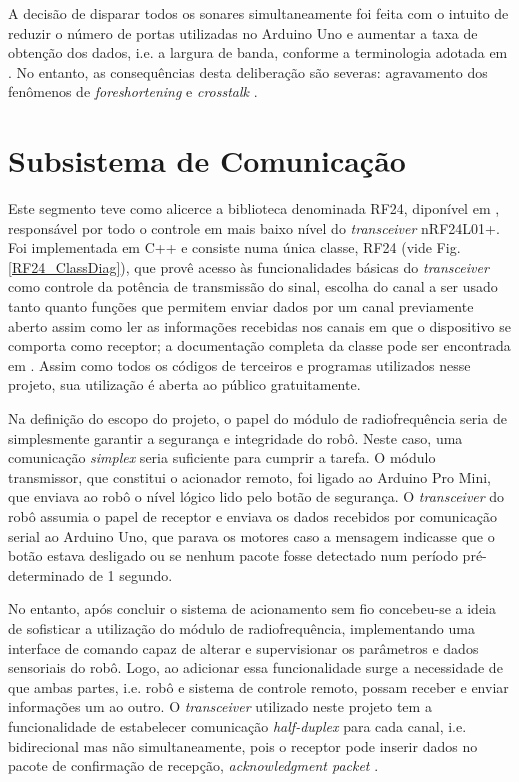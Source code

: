 A decisão de disparar todos os sonares simultaneamente foi feita com o intuito de reduzir o número de portas utilizadas no Arduino Uno e aumentar 
a taxa de obtenção dos dados, i.e. a largura de banda, conforme a terminologia adotada  em \cite{roseli}.
No entanto, as consequências desta deliberação são  severas: agravamento dos fenômenos de \textit{foreshortening} e \textit{crosstalk} 
\cite{2016_artigo_5}. %


\section{Subsistema de Comunicação}
Este segmento teve como alicerce a biblioteca denominada RF24, diponível em \cite{nrf_lib}, responsável por todo o controle em mais baixo nível do 
\textit{transceiver} nRF24L01+.
Foi implementada em C++ e consiste numa única classe, RF24 (vide Fig.\ref{RF24_ClassDiag}), que provê acesso às funcionalidades básicas do 
\textit{transceiver} 
como controle da potência de transmissão do sinal, escolha do canal a ser usado tanto quanto funções que permitem enviar dados por um canal 
previamente aberto assim como ler as informações recebidas nos canais em que o dispositivo se comporta como receptor; a documentação completa da 
classe pode ser encontrada em \cite{RF24_class_doc}.
Assim como todos os códigos de terceiros e programas utilizados nesse projeto, sua utilização é aberta ao público gratuitamente.

Na definição do escopo do projeto, o papel do módulo de radiofrequência seria de simplesmente garantir a segurança e integridade do robô.
Neste caso, uma comunicação \textit{simplex} seria suficiente para cumprir a tarefa.
O módulo transmissor, que constitui o acionador remoto, foi ligado ao Arduino Pro Mini, que enviava ao robô o nível lógico lido pelo botão de 
segurança.
O \textit{transceiver} do robô assumia o papel de receptor e enviava os dados recebidos por comunicação serial ao Arduino Uno, que parava os motores 
caso a mensagem indicasse que o botão estava desligado ou se nenhum pacote fosse detectado num período pré-determinado de 1 segundo.

No entanto, após concluir o sistema de acionamento sem fio concebeu-se a ideia de sofisticar a utilização do módulo de radiofrequência, implementando 
uma interface de comando capaz de alterar e supervisionar os parâmetros e dados sensoriais do robô.
Logo, ao adicionar essa funcionalidade surge a necessidade de que ambas partes, i.e. robô e sistema de controle remoto, possam receber e enviar 
informações um ao outro.
O \textit{transceiver} utilizado neste projeto tem a funcionalidade de estabelecer comunicação \textit{half-duplex} para cada canal, i.e. 
bidirecional mas não simultaneamente, pois o receptor pode inserir dados no pacote de confirmação de recepção, \textit{acknowledgment packet} 
\cite{nRF}.

